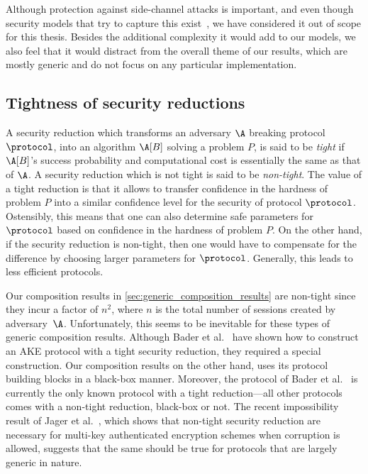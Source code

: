 Although protection against side-channel attacks is important,
and even though security models that try to capture this exist~\cite{ASIACCS:AlaSteBoy14},
we have considered it out of scope for this thesis.
Besides the additional complexity it would add to our models,
we also feel that it would distract from the overall theme of our results,
which are mostly generic and do not focus on any particular implementation.





 

\subsection{Tightness of security reductions}
A security reduction which transforms an adversary $\A$
breaking protocol $\protocol$,
into an algorithm $\A[B]$
solving a problem $P$,
is said to be \emph{tight} if $\A[B]$'s success probability and computational cost is essentially the same as that of $\A$.
A security reduction which is not tight is said to be \emph{non-tight}.
The value of a tight reduction is that it allows to transfer  confidence in the hardness of problem $P$  into a similar confidence level for the security of protocol $\protocol$.
Ostensibly,
this means that one can also determine safe parameters for $\protocol$ based on confidence in the hardness of problem $P$.
On the other hand,
if the security reduction is non-tight,
then one would have to compensate for the difference by choosing larger parameters for $\protocol$.
Generally,
this leads to less efficient protocols.

Our composition results in \cref{sec:generic_composition_results} are non-tight since they incur a factor of $n^2$,
where $n$ is the total number of sessions created by adversary~$\A$.
Unfortunately,
this seems to be inevitable for these types of generic composition results.
Although Bader et al.~\cite{TCC:BHJKL15} have  shown how to construct an AKE protocol with a tight security reduction,
they required a special construction.
Our composition results on the other hand,
uses its protocol building blocks in a black-box manner.
Moreover,
the protocol of Bader et al.~\cite{TCC:BHJKL15} is currently the only known protocol with a tight reduction---all 
other protocols comes with a non-tight reduction,
black-box or not.
The recent impossibility result of Jager et al.~\cite{EPRINT:JSSW17},
which shows that non-tight security reduction are necessary for multi-key authenticated encryption schemes when corruption is allowed,
suggests that the same should be true for protocols that are largely generic in nature.


